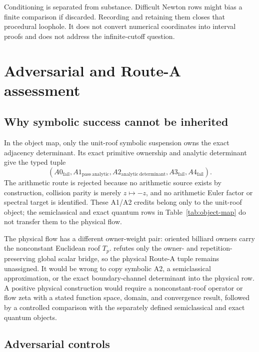 \documentclass[11pt,a4paper]{article}
\theoremstyle{definition}
\theoremstyle{remark}
\begin{document}
Conditioning is separated from substance. Difficult Newton rows might bias a finite comparison if discarded. Recording and retaining them closes that procedural loophole. It does not convert numerical coordinates into interval proofs and does not address the infinite-cutoff question.

\section{Adversarial and Route-A assessment}

\subsection{Why symbolic success cannot be inherited}

In the object map, only the unit-roof symbolic suspension owns the exact adjacency determinant. Its exact primitive ownership and analytic determinant give the typed tuple
\[
 (A0_{\mathrm{fail}},A1_{\mathrm{pass\ analytic}},
 A2_{\mathrm{analytic\ determinant}},A3_{\mathrm{fail}},A4_{\mathrm{fail}}).
\]
The arithmetic route is rejected because no arithmetic source exists by construction, collision parity is merely \(z\mapsto-z\), and no arithmetic Euler factor or spectral target is identified. These A1/A2 credits belong only to the unit-roof object; the semiclassical and exact quantum rows in Table~\ref{tab:object-map} do not transfer them to the physical flow.

The physical flow has a different owner-weight pair: oriented billiard owners carry the nonconstant Euclidean roof \(T_p\).  refutes only the owner- and repetition-preserving global scalar bridge, so the physical Route-A tuple remains unassigned. It would be wrong to copy symbolic A2, a semiclassical approximation, or the exact boundary-channel determinant into the physical row. A positive physical construction would require a nonconstant-roof operator or flow zeta with a stated function space, domain, and convergence result, followed by a controlled comparison with the separately defined semiclassical and exact quantum objects.

\subsection{Adversarial controls}
\end{document}
